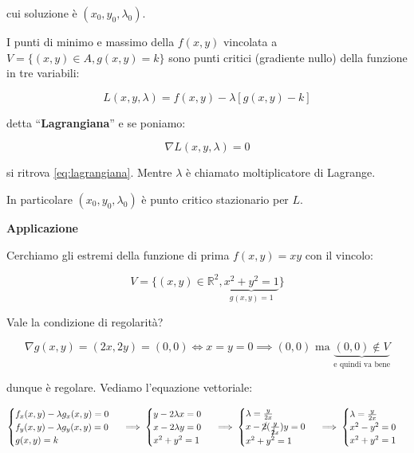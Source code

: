 \documentclass[../appunti-analisi.tex]{subfiles}
\begin{document}
cui soluzione è $(x_0,y_0,\lambda_0)$. 

I punti di minimo e massimo della $f(x,y)$ vincolata a $V= \{(x,y) \in A, g(x,y) = k\}$ sono punti critici (gradiente nullo) della funzione in tre variabili:

\[
    L(x,y,\lambda) = f(x,y) - \lambda [g(x,y) -k]
\]

detta ``\textbf{Lagrangiana}'' e se poniamo:

\[
    \nabla L(x,y,\lambda) = 0
\]

si ritrova \ref{eq:lagrangiana}. Mentre $\lambda$ è chiamato moltiplicatore di Lagrange.

In particolare $(x_0,y_0, \lambda_0)$ è punto critico stazionario per $L$.

\newpage

\textbf{Applicazione} 

Cerchiamo gli estremi della funzione di prima $f(x,y) = xy$ con il vincolo:

\[
    V= \{(x,y) \in \mathbb{R}^{2}, \underbrace{x^{2}+y^{2} = 1}_\text{$g(x,y) = 1$}\}
\]

Vale la condizione di regolarità?

\[
    \nabla g(x,y) = (2x,2y) = (0,0) \Leftrightarrow x=y=0 \implies (0,0) \text{ ma } \underbrace{(0,0) \notin V}_\text{e quindi va bene}
\]

dunque è regolare. Vediamo l'equazione vettoriale:

\[
        \begin{cases}
               f_x(x,y) - \lambda g_x(x,y) = 0\\
               f_y(x,y) - \lambda g_y(x,y) = 0\\
               g(x,y) = k
        \end{cases}\, \implies
        \begin{cases}
               y -2 \lambda x= 0\\
               x -2 \lambda y = 0\\
               x^{2}+ y^{2}= 1
        \end{cases}\, \implies
        \begin{cases}
               \lambda= \frac{y}{2x}\\
               x-\cancel{2}( \frac{y}{\cancel{2}x})y= 0\\
               x^{2}+ y^{2}= 1
        \end{cases}\, \implies
        \begin{cases}
               \lambda= \frac{y}{2x}\\
               x^{2}-y^{2}= 0\\
               x^{2}+ y^{2}= 1
        \end{cases}\, 
\]
\end{document}
